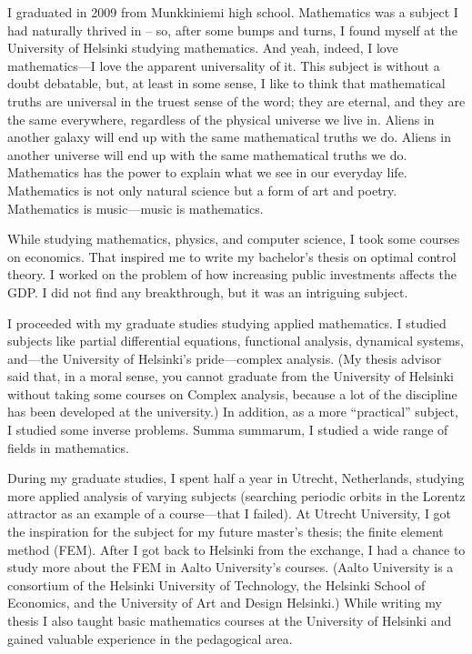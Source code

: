 \documentclass{article}
\begin{document}
        \parbox{\textwidth} {

          I graduated in 2009 from Munkkiniemi high school. Mathematics was a subject I had naturally thrived in -- so, after some bumps and turns,  I found myself at the University of Helsinki studying mathematics. And yeah, indeed, I love mathematics---I love the apparent universality of it. This subject is without a doubt debatable, but, at least in some sense, I like to think that mathematical truths are universal in the truest sense of the word; they are eternal, and they are the same everywhere, regardless of the physical universe we live in. Aliens in another galaxy will end up with the same mathematical truths we do. Aliens in another universe will end up with the same mathematical truths we do. Mathematics has the power to explain what we see in our everyday life. Mathematics is not only natural science but a form of art and poetry. Mathematics is music---music is mathematics.

          While studying mathematics, physics, and computer science, I took some courses on economics. That inspired me to write my bachelor's thesis on optimal control theory. I worked on the problem of how increasing public investments affects the GDP. I did not find any breakthrough, but it was an intriguing subject.

          I proceeded with my graduate studies studying applied mathematics. I studied subjects like partial differential equations, functional analysis, dynamical systems, and---the University of Helsinki's pride---complex analysis. (My thesis advisor said that, in a moral sense, you cannot graduate from the University of Helsinki without taking some courses on Complex analysis, because a lot of the discipline has been developed at the university.) In addition, as a more ``practical'' subject, I studied some inverse problems. Summa summarum, I studied a wide range of fields in mathematics.

          During my graduate studies, I spent half a year in Utrecht, Netherlands, studying more applied analysis of varying subjects (searching periodic orbits in the Lorentz attractor as an example of a course---that I failed). At Utrecht University, I got the inspiration for the subject for my future master's thesis; the finite element method (FEM). After I got back to Helsinki from the exchange, I had a chance to study more about the FEM in Aalto University's courses. (Aalto University is a consortium of the Helsinki University of Technology, the Helsinki School of Economics, and the University of Art and Design Helsinki.) While writing my thesis I also taught basic mathematics courses at the University of Helsinki and gained valuable experience in the pedagogical area.

}
\end{document}
